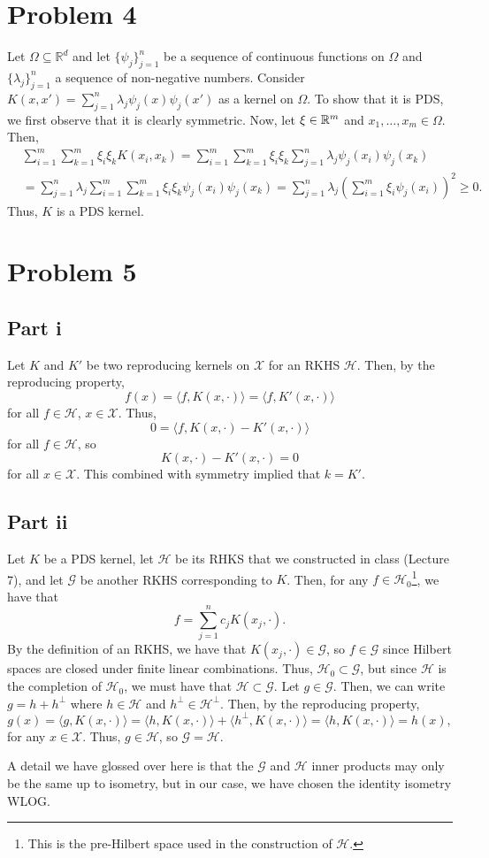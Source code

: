 \documentclass{article}
\begin{document}
\section{Problem 4}
Let $\Omega \subseteq \mathbb{R}^d$ and let $\{\psi_j\}_{j=1}^n$ be a sequence of continuous functions on $\Omega$ and $\{\lambda_j\}_{j=1}^n$ a sequence of non-negative numbers. Consider $K(x, x') = \sum\limits_{j=1}^n \lambda_j \psi_j(x) \psi_j(x')$ as a kernel on $\Omega$. To show that it is PDS, we first observe that it is clearly symmetric. Now, let $\xi\in\mathbb{R}^m$ and $x_1,\ldots,x_m\in\Omega$. Then,
\begin{align*}
&\sum_{i=1}^{m}\sum_{k=1}^m\xi_i\xi_kK(x_i,x_k)=\sum_{i=1}^{m}\sum_{k=1}^m\xi_i\xi_k\sum\limits_{j=1}^n \lambda_j \psi_j(x_i) \psi_j(x_k)\\&=
\sum_{j=1}^{n}\lambda_j\sum_{i=1}^{m}\sum_{k=1}^m\xi_i\xi_k\psi_j(x_i) \psi_j(x_k)=
\sum_{j=1}^{n}\lambda_j\left(\sum_{i=1}^{m}\xi_i\psi_j(x_i)\right)^2\geq0.
\end{align*}
Thus, $K$ is a PDS kernel.

\section{Problem 5}
\subsection{Part i}
Let $K$ and $K'$ be two reproducing kernels on $\mathcal{X}$ for an RKHS $\mathcal{H}$. Then, by the reproducing property, 
\[
f(x)=\langle f,K(x,\cdot)\rangle=\langle f,K'(x,\cdot)\rangle
\]
for all $f\in\mathcal{H}$, $x\in\mathcal{X}$. Thus,
\[
0=\langle f,K(x,\cdot)-K'(x,\cdot)\rangle
\]
for all $f\in\mathcal{H}$, so 
\[
K(x,\cdot)-K'(x,\cdot)=0
\]
for all $x\in\mathcal{X}$. This combined with symmetry implied that $k=K'$.
\subsection{Part ii}
Let $K$ be a PDS kernel, let $\mathcal{H}$ be its RHKS that we constructed in class (Lecture 7), and let $\mathcal{G}$ be another RKHS corresponding to $K$. Then, for any $f\in \mathcal{H}_0$\footnote{This is the pre-Hilbert space used in the construction of $\mathcal{H}$.}, we have that 
\[
f=\sum_{j=1}^nc_jK(x_j,\cdot).
\]
By the definition of an RKHS, we have that $K(x_j,\cdot)\in\mathcal{G}$, so $f\in\mathcal{G}$ since Hilbert spaces are closed under finite linear combinations. Thus, $\mathcal{H}_0\subset\mathcal{G}$, but since $\mathcal{H}$ is the completion of $\mathcal{H}_0$, we must have that $\mathcal{H}\subset\mathcal{G}$. Let $g\in\mathcal{G}$. Then, we can write $g=h+h^\perp$ where $h\in\mathcal{H}$ and $h^\perp\in\mathcal{H}^\perp$. Then, by the reproducing property,
\[
g(x)=\langle g,K(x,\cdot)\rangle=\langle h,K(x,\cdot)\rangle+\langle h^\perp,K(x,\cdot)\rangle=\langle h,K(x,\cdot)\rangle=h(x),
\]
for any $x\in\mathcal{X}$. Thus, $g\in\mathcal{H}$, so $\mathcal{G}=\mathcal{H}$.

A detail we have glossed over here is that the $\mathcal{G}$ and $\mathcal{H}$ inner products may only be the same up to isometry, but in our case, we have chosen the identity isometry WLOG.
\end{document}
